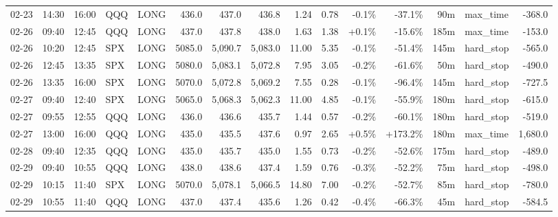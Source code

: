 \documentclass[11pt,a4paper,twoside]{article}
\begin{document}
\begin{landscape}
\begin{center}
\begin{longtable}{>{\color{txtmain}}l l l l l r r r r r r r r >{\color{txtmain}}l r}
02-23 & 14:30 & 16:00 & QQQ & LONG & 436.0 & 437.0 & 436.8 & 1.24 & 0.78 & \textcolor{lossred}{-0.1\%} & \textcolor{lossred}{-37.1\%} & 90m & max\_time & \textcolor{lossred}{-368.0} \\
02-26 & 09:40 & 12:45 & QQQ & LONG & 437.0 & 437.8 & 438.0 & 1.63 & 1.38 & \textcolor{wingreen}{+0.1\%} & \textcolor{lossred}{-15.6\%} & 185m & max\_time & \textcolor{lossred}{-153.0} \\
02-26 & 10:20 & 12:45 & SPX & LONG & 5085.0 & 5,090.7 & 5,083.0 & 11.00 & 5.35 & \textcolor{lossred}{-0.1\%} & \textcolor{lossred}{-51.4\%} & 145m & hard\_stop & \textcolor{lossred}{-565.0} \\
02-26 & 12:45 & 13:35 & SPX & LONG & 5080.0 & 5,083.1 & 5,072.8 & 7.95 & 3.05 & \textcolor{lossred}{-0.2\%} & \textcolor{lossred}{-61.6\%} & 50m & hard\_stop & \textcolor{lossred}{-490.0} \\
02-26 & 13:35 & 16:00 & SPX & LONG & 5070.0 & 5,072.8 & 5,069.2 & 7.55 & 0.28 & \textcolor{lossred}{-0.1\%} & \textcolor{lossred}{-96.4\%} & 145m & hard\_stop & \textcolor{lossred}{-727.5} \\
02-27 & 09:40 & 12:40 & SPX & LONG & 5065.0 & 5,068.3 & 5,062.3 & 11.00 & 4.85 & \textcolor{lossred}{-0.1\%} & \textcolor{lossred}{-55.9\%} & 180m & hard\_stop & \textcolor{lossred}{-615.0} \\
02-27 & 09:55 & 12:55 & QQQ & LONG & 436.0 & 436.6 & 435.7 & 1.44 & 0.57 & \textcolor{lossred}{-0.2\%} & \textcolor{lossred}{-60.1\%} & 180m & hard\_stop & \textcolor{lossred}{-519.0} \\
02-27 & 13:00 & 16:00 & QQQ & LONG & 435.0 & 435.5 & 437.6 & 0.97 & 2.65 & \textcolor{wingreen}{+0.5\%} & \textcolor{wingreen}{+173.2\%} & 180m & max\_time & \textcolor{wingreen}{1,680.0} \\
02-28 & 09:40 & 12:35 & QQQ & LONG & 435.0 & 435.7 & 435.0 & 1.55 & 0.73 & \textcolor{lossred}{-0.2\%} & \textcolor{lossred}{-52.6\%} & 175m & hard\_stop & \textcolor{lossred}{-489.0} \\
02-29 & 09:40 & 10:55 & QQQ & LONG & 438.0 & 438.6 & 437.4 & 1.59 & 0.76 & \textcolor{lossred}{-0.3\%} & \textcolor{lossred}{-52.2\%} & 75m & hard\_stop & \textcolor{lossred}{-498.0} \\
02-29 & 10:15 & 11:40 & SPX & LONG & 5070.0 & 5,078.1 & 5,066.5 & 14.80 & 7.00 & \textcolor{lossred}{-0.2\%} & \textcolor{lossred}{-52.7\%} & 85m & hard\_stop & \textcolor{lossred}{-780.0} \\
02-29 & 10:55 & 11:40 & QQQ & LONG & 437.0 & 437.4 & 435.6 & 1.26 & 0.42 & \textcolor{lossred}{-0.4\%} & \textcolor{lossred}{-66.3\%} & 45m & hard\_stop & \textcolor{lossred}{-584.5} \\

\end{longtable}
\end{center}
\end{landscape}
\end{document}

